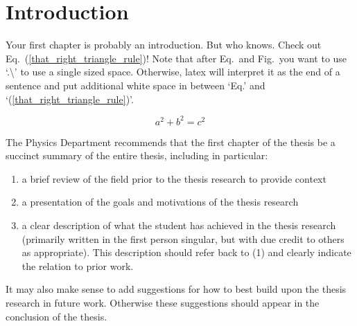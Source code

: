 \chapter{Introduction}
Your first chapter is probably an introduction. But who knows. Check out Eq.\ (\ref{that_right_triangle_rule})!
Note that after Eq.\ and Fig.\ you want to use `.\textbackslash'  to use a single sized space. Otherwise,
latex will interpret it as the end of a sentence and put additional white space in between `Eq.' and 
`(\ref{that_right_triangle_rule})'.

\begin{equation}
a^2 + b^2 = c^2 \label{that_right_triangle_rule}
\end{equation}

The Physics Department recommends that the first chapter of the thesis be 
a succinct summary of the entire thesis, including in particular:

\begin{enumerate}
  \item a brief review of the field prior to the thesis research to provide context
  \item a presentation of the goals and motivations of the thesis research 
  \item a clear description of what the student has achieved in the thesis research
 (primarily written in the first person singular, but with due credit to
 others as appropriate). This description should refer back to (1) and clearly indicate the relation
 to prior work.
\end{enumerate}
It may also make sense to add suggestions for how to best build upon the thesis research in future work. Otherwise these suggestions should appear in the conclusion of the thesis.
